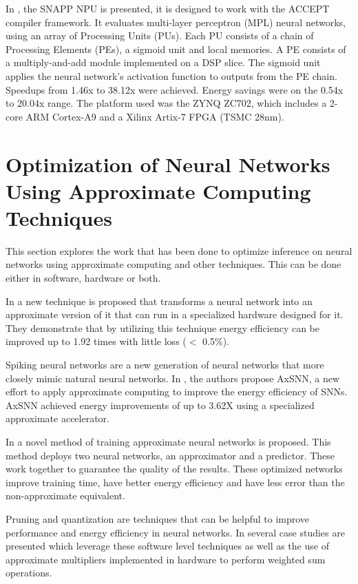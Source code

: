 In \cite{Moreau2015}, the SNAPP NPU is presented, it is designed to work with the ACCEPT compiler framework. It evaluates multi-layer perceptron (MPL) neural networks, using an array of Processing Units (PUs). Each PU consists of a chain of Processing Elements (PEs), a sigmoid unit and local memories. A PE consists of a multiply-and-add module implemented on a DSP slice. The sigmoid unit applies the neural network’s activation function to outputs from the PE chain. Speedups from 1.46x to 38.12x were achieved. Energy savings were on the 0.54x to 20.04x range. The platform used was the ZYNQ ZC702, which includes a 2-core ARM Cortex-A9 and a Xilinx Artix-7 FPGA (TSMC 28nm).

\section{Optimization of Neural Networks Using Approximate Computing Techniques}

This section explores the work that has been done to optimize inference on neural networks using approximate computing and other techniques. This can be done either in software, hardware or both.

In \cite{Venkataramani2015} a new technique is proposed that transforms a neural network into an approximate version of it that can run in a specialized hardware designed for it. They demonstrate that by utilizing this technique energy efficiency can be improved up to 1.92 times with little loss ($<$ 0.5\%).

Spiking neural networks are a new generation of neural networks that more closely mimic natural neural networks. In \cite{Sen2017}, the authors propose AxSNN, a new effort to apply approximate computing to improve the energy efficiency of SNNs. AxSNN achieved energy improvements of up to 3.62X using a specialized approximate accelerator.

In \cite{Peng2018} a novel method of training approximate neural networks is proposed. This method deploys two neural networks, an approximator and a predictor. These work together to guarantee the quality of the results. These optimized networks improve training time, have better energy efficiency and have less error than the non-approximate equivalent.

Pruning and quantization are techniques that can be helpful to improve performance and energy efficiency in neural networks. In \cite{Hanif2018} several case studies are presented which leverage these software level techniques as well as the use of approximate multipliers implemented in hardware to perform weighted sum operations.

